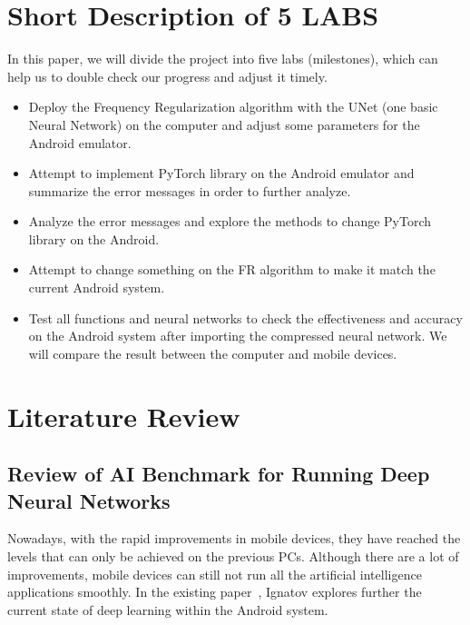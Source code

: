 \documentclass{article}
\begin{document}
\section{Short Description of 5 LABS}

In this paper, we will divide the project into five labs (milestones), which can help us to double check our progress and adjust it timely.

\begin{itemize}
	\item Deploy the Frequency Regularization algorithm with the UNet (one basic Neural Network) on the computer and adjust some parameters for the Android emulator. 
	
	\item Attempt to implement PyTorch library on the Android emulator and summarize the error messages in order to further analyze.
	
	\item Analyze the error messages and explore the methods to change PyTorch library on the Android.
	
	\item Attempt to change something on the FR algorithm to make it match the current Android system. 
	
	\item Test all functions and neural networks to check the effectiveness and accuracy on the Android system after importing the compressed neural network. We will compare the result between the computer and mobile devices. 
	
\end{itemize}


\pagebreak
\section{Literature Review}

\subsection{Review of AI Benchmark for Running Deep Neural Networks}
Nowadays, with the rapid improvements in mobile devices, they have reached the levels that can only be achieved on the previous PCs. Although there are a lot of improvements, mobile devices can still not run all the artificial intelligence applications smoothly. In the existing paper~\cite{Andrey2019Aibenchmark}, Ignatov explores further the current state of deep learning within the Android system.
\end{document}
